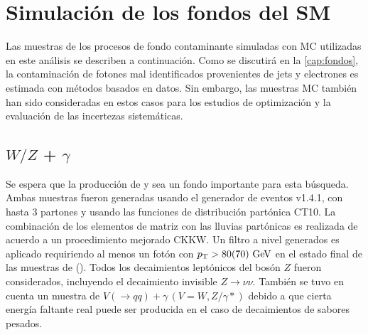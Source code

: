 \section{Simulación de los fondos del SM}
\label{sec:bkg_samples}

\newcommand{\mccaption}{Se detallan la sección eficaz a LO para cada modo de decaimiento,
  los factores $k$ (para la normalización NLO) y las eficiencias del filtro,
  así como también la luminosidad integrada correspondiente
  a la estadística total de cada muestra.}


Las muestras de los procesos de fondo contaminante simuladas con MC utilizadas
en este análisis se describen a continuación. Como se discutirá en la
\cref{cap:fondos}, la contaminación de fotones mal identificados
provenientes de jets y electrones es estimada con métodos basados en datos. Sin
embargo, las muestras MC también han sido consideradas en estos casos para los
estudios de optimización y la evaluación de las incertezas sistemáticas.

\subsection{$W/Z$ + $\gamma$}

Se espera que la producción de {\wgam} y {\zgam} sea un fondo importante
para esta búsqueda. Ambas muestras fueron generadas usando el generador
de eventos {\sherpa} v1.4.1\cite{SherpaGen}, con hasta 3 partones y
usando las funciones de distribución partónica CT10.
La combinación de los elementos de matriz con las lluvias partónicas
es realizada de acuerdo a un procedimiento mejorado CKKW\cite{Catani:2001cc,Krauss:2002up}.
Un filtro a nivel generados es aplicado requiriendo al menos un fotón
con $\pt > 80(70) \gev$ en el estado final de las muestras de {\wgam} (\zgam).
Todos los decaimientos leptónicos del bosón $Z$ fueron considerados,
incluyendo el decaimiento invisible $Z\to\nu\nu$.
También se tuvo en cuenta un muestra de $V(\to qq)+\gamma\,  (V=W,Z/\gamma*)$
debido a que cierta energía faltante real puede  ser producida en el caso
de decaimientos de sabores pesados.

